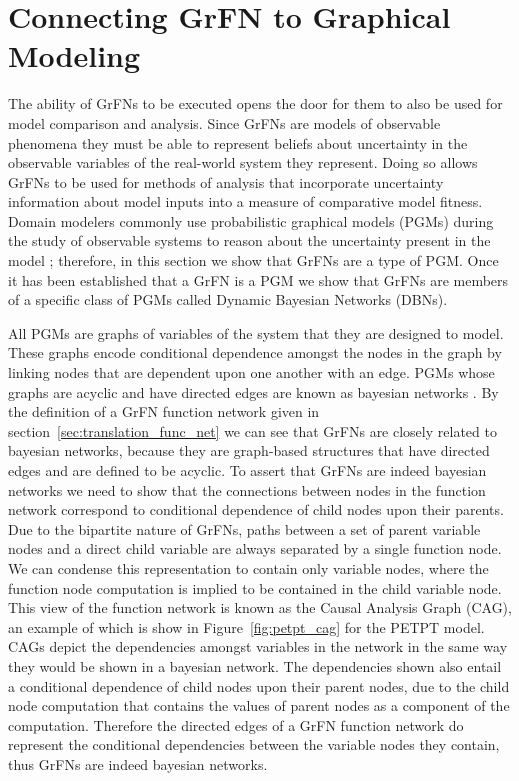 \section{Connecting GrFN to Graphical Modeling\label{sec:grfns_are_pgms}}
The ability of GrFNs to be executed opens the door for them to also be used for model comparison and analysis.
Since GrFNs are models of observable phenomena they must be able to represent beliefs about uncertainty in the observable variables of the real-world system they represent.
Doing so allows GrFNs to be used for methods of analysis that incorporate uncertainty information about model inputs into a measure of comparative model fitness.
Domain modelers commonly use probabilistic graphical models (PGMs) during the study of observable systems to reason about the uncertainty present in the model \citep{pearl2014probabilistic}; therefore, in this section we show that GrFNs are a type of PGM.
Once it has been established that a GrFN is a PGM we show that GrFNs are members of a specific class of PGMs called Dynamic Bayesian Networks (DBNs).

All PGMs are graphs of variables of the system that they are designed to model.
These graphs encode conditional dependence amongst the nodes in the graph by linking nodes that are dependent upon one another with an edge.
PGMs whose graphs are acyclic and have directed edges are known as bayesian networks \citep{bishop2006pattern}.
By the definition of a GrFN function network given in section~\ref{sec:translation_func_net} we can see that GrFNs are closely related to bayesian networks, because they are graph-based structures that have directed edges and are defined to be acyclic.
To assert that GrFNs are indeed bayesian networks we need to show that the connections between nodes in the function network correspond to conditional dependence of child nodes upon their parents.
Due to the bipartite nature of GrFNs, paths between a set of parent variable nodes and a direct child variable are always separated by a single function node.
We can condense this representation to contain only variable nodes, where the function node computation is implied to be contained in the child variable node.
This view of the function network is known as the Causal Analysis Graph (CAG), an example of which is show in Figure~\ref{fig:petpt_cag} for the PETPT model.
CAGs depict the dependencies amongst variables in the network in the same way they would be shown in a bayesian network.
The dependencies shown also entail a conditional dependence of child nodes upon their parent nodes, due to the child node computation that contains the values of parent nodes as a component of the computation.
Therefore the directed edges of a GrFN function network do represent the conditional dependencies between the variable nodes they contain, thus GrFNs are indeed bayesian networks.

